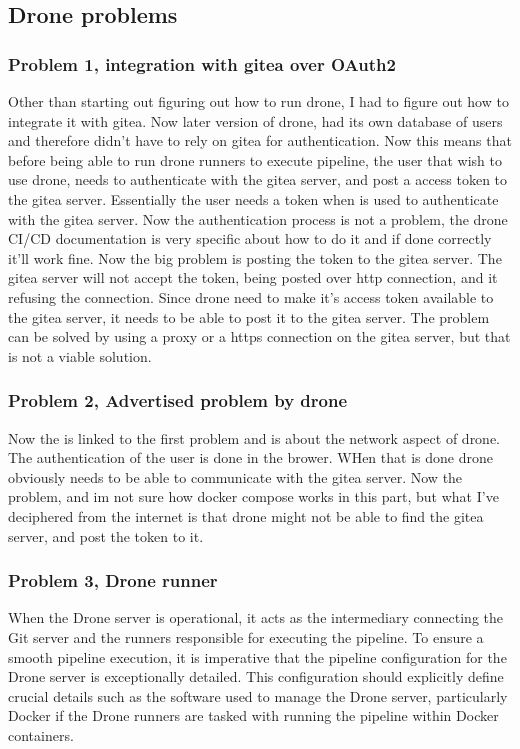 \subsection{Drone problems}
\subsubsection{Problem 1, integration with gitea over OAuth2}
Other than starting out figuring out how to run drone, I had to figure out how to integrate it with gitea.
Now later version of drone, had its own database of users and therefore didn't have to rely on gitea for authentication.
Now this means that before being able to run drone runners to execute pipeline, the user that wish to use drone,
needs to authenticate with the gitea server, and post a access token to the gitea server. Essentially the user needs a token 
when is used to authenticate with the gitea server.
Now the authentication process is not a problem, the drone CI/CD documentation is very specific about how to do it and if done 
correctly it'll work fine.
Now the big problem is posting the token to the gitea server. The gitea server will not accept the token, being posted over http connection,
and it refusing the connection. 
Since drone need to make it's access token available to the gitea server, it needs to be able to post it to the gitea server.
The problem can be solved by using a proxy or a https connection on the gitea server, but that is not a viable solution.

\subsubsection{Problem 2, Advertised problem by drone}
Now the is linked to the first problem and is about the network aspect of drone.
The authentication of the user is done in the brower. WHen that is done drone obviously needs to be able to communicate with the gitea server.
Now the problem, and im not sure how docker compose works in this part, but what I've deciphered from the internet is that 
drone might not be able to find the gitea server, and post the token to it.

\subsubsection{Problem 3, Drone runner}
When the Drone server is operational, it acts as the intermediary connecting the Git server 
and the runners responsible for executing the pipeline. 
To ensure a smooth pipeline execution, it is imperative that the pipeline configuration 
for the Drone server is exceptionally detailed. This configuration should explicitly define 
crucial details such as the software used to manage the Drone server, particularly Docker if the Drone runners 
are tasked with running the pipeline within Docker containers.

